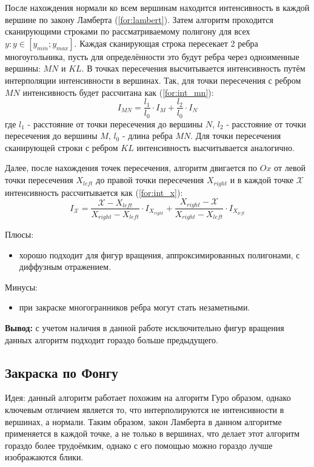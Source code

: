 После нахождения нормали ко всем вершинам находится интенсивность в каждой вершине по закону Ламберта (\ref{for:lambert}).
Затем алгоритм проходится сканирующими строками по рассматриваемому полигону для всех $y: y \in [y_{min}; y_{max}]$. Каждая сканирующая строка пересекает 2 ребра многоугольника, пусть для определённости это будут ребра через одноименные вершины: $MN$ и $KL$. В точках пересечения высчитывается интенсивность путём интерполяции интенсивности в вершинах. Так, для точки пересечения с ребром $MN$ интенсивность будет рассчитана как (\ref{for:int_mn}):
\begin{equation}
    \label{for:int_mn}
    I_{MN} = \frac{l_1}{l_0} \cdot I_M + \frac{l_2}{l_0} \cdot I_N
\end{equation}
где $l_1$ - расстояние от точки пересечения до вершины $N$, $l_2$ - расстояние от точки пересечения до вершины $M$, $l_0$ - длина ребра $MN$.
Для точки пересечения сканирующей строки с ребром $KL$ интенсивность высчитывается аналогично.

Далее, после нахождения точек пересечения, алгоритм двигается по $Ox$ от левой точки пересечения $X_{left}$ до правой точки пересечения $X_{right}$ и в каждой точке $\mathcal{X}$ интенсивность рассчитывается как (\ref{for:int_x}):
\begin{equation}
    \label{for:int_x}
    I_{\mathcal{X}} = \frac{\mathcal{X} - X_{left}}{X_{right} - X_{left}} \cdot I_{X_{right}} + \frac{X_{right} - \mathcal{X}}{X_{right} - X_{left}} \cdot I_{X_{left}}
\end{equation}

Плюсы:
\begin{itemize}
    \item хорошо подходит для фигур вращения, аппроксимированных полигонами, с диффузным отражением.
\end{itemize}

Минусы:
\begin{itemize}
    \item при закраске многогранников ребра могут стать незаметными.
\end{itemize}

\textbf{Вывод:} с учетом наличия в данной работе исключительно фигур вращения данных алгоритм подходит гораздо больше предыдущего.


\subsection{Закраска по Фонгу}
Идея: данный алгоритм работает похожим на алгоритм Гуро образом, однако ключевым отличием является то, что интерполируются не интенсивности в вершинах, а нормали. Таким образом, закон Ламберта в данном алгоритме применяется в каждой точке, а не только в вершинах, что делает этот алгоритм гораздо более трудоёмким, однако с его помощью можно гораздо лучше изображаются блики.

